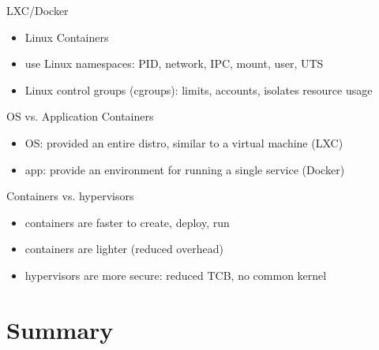 \documentclass{curs}
\begin{document}
\begin{frame}{LXC/Docker}
  \begin{itemize}
    \item Linux Containers
    \item use Linux namespaces: PID, network, IPC, mount, user, UTS
    \item Linux control groups (cgroups): limits, accounts, isolates resource usage
  \end{itemize}
\end{frame}

\begin{frame}{OS vs. Application Containers}
  \begin{itemize}
    \item OS: provided an entire distro, similar to a virtual machine (LXC)
    \item app: provide an environment for running a single service (Docker)
  \end{itemize}
\end{frame}

\begin{frame}{Containers vs. hypervisors}
  \begin{itemize}
    \item containers are faster to create, deploy, run
    \item containers are lighter (reduced overhead)
    \item hypervisors are more secure: reduced TCB, no common kernel
  \end{itemize}
\end{frame}

\section{Summary}
\end{document}
